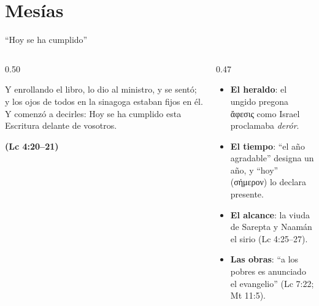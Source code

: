\documentclass[hyperref={bookmarks=false},aspectratio=169]{beamer}
\newcommand{\grc}[1]{\foreignlanguage{ancientgreek}{#1}}
\newcommand{\fuente}[1]{\par\hfill{\upshape\bfseries\footnotesize\textcolor{tierraroja}{#1}}}
\newcommand{\destacar}[1]{\textbf{\textcolor{tierraroja}{#1}}}
\begin{document}
\section{Mesías}

\begin{frame}{``Hoy se ha cumplido''}
\begin{columns}[c,onlytextwidth]
\begin{column}{0.50\textwidth}
\begin{cita}Y enrollando el libro, lo dio al ministro, y se sentó; y los ojos de todos en la sinagoga estaban fijos en él. Y comenzó a decirles: Hoy se ha cumplido esta Escritura delante de vosotros.\fuente{(Lc 4:20--21)}\end{cita}
\end{column}
\begin{column}{0.47\textwidth}\scriptsize
\begin{itemize}
\item \destacar{El heraldo}: el ungido pregona \grc{ἄφεσις} como Israel proclamaba \emph{derór}.
\item \destacar{El tiempo}: ``el año agradable'' designa un año, y ``hoy'' (\grc{σήμερον}) lo declara presente.
\item \destacar{El alcance}: la viuda de Sarepta y Naamán el sirio (Lc 4:25--27).
\item \destacar{Las obras}: ``a los pobres es anunciado el evangelio'' (Lc 7:22; Mt 11:5).
\end{itemize}
\end{column}
\end{columns}
\end{frame}
\end{document}
